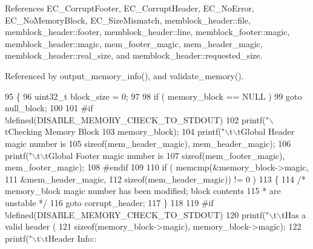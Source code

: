 References E\-C\-\_\-\-Corrupt\-Footer, E\-C\-\_\-\-Corrupt\-Header, E\-C\-\_\-\-No\-Error, E\-C\-\_\-\-No\-Memory\-Block, E\-C\-\_\-\-Size\-Mismatch, memblock\-\_\-header\-::file, memblock\-\_\-header\-::footer, memblock\-\_\-header\-::line, memblock\-\_\-footer\-::magic, memblock\-\_\-header\-::magic, mem\-\_\-footer\-\_\-magic, mem\-\_\-header\-\_\-magic, memblock\-\_\-header\-::real\-\_\-size, and memblock\-\_\-header\-::requested\-\_\-size.



Referenced by output\-\_\-memory\-\_\-info(), and validate\-\_\-memory().


\begin{DoxyCode}
95 \{
96         uint32\_t        block\_size = 0;
97 
98         \textcolor{keywordflow}{if} ( memory\_block == NULL )
99                 \textcolor{keywordflow}{goto} null\_block;
100 
101 \textcolor{preprocessor}{#if !defined(DISABLE\_MEMORY\_CHECK\_TO\_STDOUT)
}
102 \textcolor{preprocessor}{}        printf(\textcolor{stringliteral}{"\(\backslash\)tChecking Memory Block %
103                 memory\_block);
104         printf(\textcolor{stringliteral}{"\(\backslash\)t\(\backslash\)tGlobal Header magic number is %
105                 \textcolor{keyword}{sizeof}(mem_header_magic), mem_header_magic);
106         printf(\textcolor{stringliteral}{"\(\backslash\)t\(\backslash\)tGlobal Footer magic number is %
107                 \textcolor{keyword}{sizeof}(mem_footer_magic), mem_footer_magic);
108 \textcolor{preprocessor}{#endif
}
109 \textcolor{preprocessor}{}
110         \textcolor{keywordflow}{if} ( memcmp(&memory\_block->magic,
111                 &mem_header_magic,
112                 \textcolor{keyword}{sizeof}(mem_header_magic)) != 0 )
113         \{
114                 \textcolor{comment}{/* memory\_block magic number has been modified; block contents
}
115 \textcolor{comment}{                 * are unstable */}
116                 \textcolor{keywordflow}{goto} corrupt\_header;
117         \}
118 
119 \textcolor{preprocessor}{#if !defined(DISABLE\_MEMORY\_CHECK\_TO\_STDOUT)
}
120 \textcolor{preprocessor}{}        printf(\textcolor{stringliteral}{"\(\backslash\)t\(\backslash\)tHas a valid header (%
121                 \textcolor{keyword}{sizeof}(memory\_block->magic), memory\_block->magic);
122         printf(\textcolor{stringliteral}{"\(\backslash\)t\(\backslash\)tHeader Info:: %
}}}}}
\end{DoxyCode}
